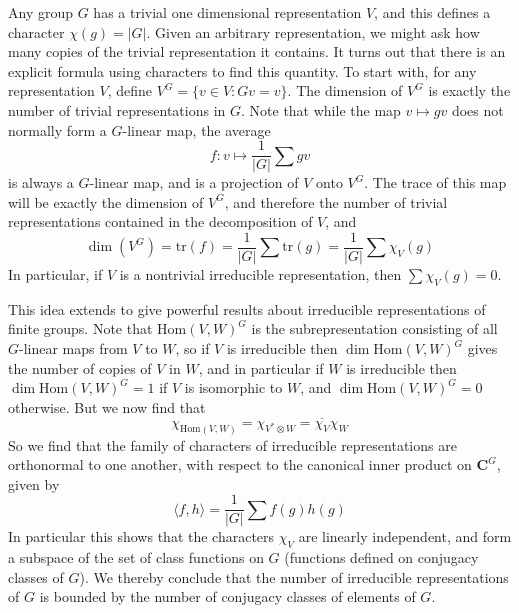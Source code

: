 Any group $G$ has a trivial one dimensional representation $V$, and this defines a character $\chi(g) = |G|$. Given an arbitrary representation, we might ask how many copies of the trivial representation it contains. It turns out that there is an explicit formula using characters to find this quantity. To start with, for any representation $V$, define $V^G = \{ v \in V : Gv = v \}$. The dimension of $V^G$ is exactly the number of trivial representations in $G$. Note that while the map $v \mapsto gv$ does not normally form a $G$-linear map, the average
%
\[ f: v \mapsto \frac{1}{|G|} \sum gv \]
%
is always a $G$-linear map, and is a projection of $V$ onto $V^G$. The trace of this map will be exactly the dimension of $V^G$, and therefore the number of trivial representations contained in the decomposition of $V$, and
%
\[ \dim(V^G) = \text{tr}(f) = \frac{1}{|G|} \sum \text{tr}(g) = \frac{1}{|G|} \sum \chi_V(g) \]
%
In particular, if $V$ is a nontrivial irreducible representation, then $\sum \chi_V(g) = 0$.

This idea extends to give powerful results about irreducible representations of finite groups. Note that $\text{Hom}(V,W)^G$ is the subrepresentation consisting of all $G$-linear maps from $V$ to $W$, so if $V$ is irreducible then $\dim \text{Hom}(V,W)^G$ gives the number of copies of $V$ in $W$, and in particular if $W$ is irreducible then $\dim \text{Hom}(V,W)^G = 1$ if $V$ is isomorphic to $W$, and $\dim \text{Hom}(V,W)^G = 0$ otherwise. But we now find that
%
\[ \chi_{\text{Hom}(V,W)} = \chi_{V^* \otimes W} = \overline{\chi_V} \chi_W \]
%
So we find that the family of characters of irreducible representations are orthonormal to one another, with respect to the canonical inner product on $\mathbf{C}^G$, given by
%
\[ \langle f, h \rangle = \frac{1}{|G|} \sum f(g) h(g) \]
%
In particular this shows that the characters $\chi_V$ are linearly independent, and form a subspace of the set of class functions on $G$ (functions defined on conjugacy classes of $G$). We thereby conclude that the number of irreducible representations of $G$ is bounded by the number of conjugacy classes of elements of $G$.

